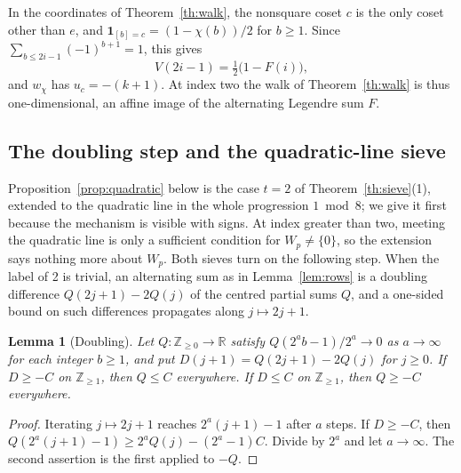 \documentclass[11pt,reqno]{amsart}
\newtheorem{lemma}[theorem]{Lemma}
\newcommand{\R}{\mathbb R}
\newcommand{\Z}{\mathbb Z}
\begin{document}
In the coordinates of Theorem~\ref{th:walk}, the nonsquare coset \(c\) is the only coset other than \(e\), and \(\mathbf 1_{[b]=c}=(1-\chi(b))/2\) for \(b\ge1\). Since \(\sum_{b\le2i-1}(-1)^{b+1}=1\), this gives
\[
 V(2i-1)=\tfrac12\big(1-F(i)\big),
\]
and \(w_\chi\) has \(u_c=-(k+1)\). At index two the walk of Theorem~\ref{th:walk} is thus one-dimensional, an affine image of the alternating Legendre sum \(F\).

\subsection*{The doubling step and the quadratic-line sieve}
Proposition~\ref{prop:quadratic} below is the case \(t=2\) of Theorem~\ref{th:sieve}(1), extended to the quadratic line in the whole progression \(1\bmod8\); we give it first because the mechanism is visible with signs. At index greater than two, meeting the quadratic line is only a sufficient condition for \(W_p\ne\{0\}\), so the extension says nothing more about \(W_p\). Both sieves turn on the following step. When the label of 2 is trivial, an alternating sum as in Lemma~\ref{lem:rows} is a doubling difference \(Q(2j+1)-2Q(j)\) of the centred partial sums \(Q\), and a one-sided bound on such differences propagates along \(j\mapsto2j+1\).

\begin{lemma}[Doubling]\label{lem:doubling}
Let \(Q:\Z_{\ge0}\to\R\) satisfy \(Q(2^ab-1)/2^a\to0\) as \(a\to\infty\) for each integer \(b\ge1\), and put \(D(j+1)=Q(2j+1)-2Q(j)\) for \(j\ge0\). If \(D\ge-C\) on \(\Z_{\ge1}\), then \(Q\le C\) everywhere. If \(D\le C\) on \(\Z_{\ge1}\), then \(Q\ge-C\) everywhere.
\end{lemma}
\begin{proof}
Iterating \(j\mapsto2j+1\) reaches \(2^a(j+1)-1\) after \(a\) steps. If \(D\ge-C\), then \(Q(2^a(j+1)-1)\ge2^aQ(j)-(2^a-1)C\). Divide by \(2^a\) and let \(a\to\infty\). The second assertion is the first applied to \(-Q\).
\end{proof}
\end{document}
